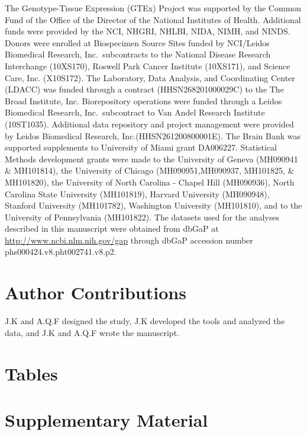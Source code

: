 \documentclass[12pt,letterpaper]{report}
\begin{document}
The Genotype-Tissue Expression (GTEx) Project was supported by the Common Fund of the Office of the Director of the National Institutes of Health. Additional funds were provided by the NCI, NHGRI, NHLBI, NIDA, NIMH, and NINDS. Donors were enrolled at Biospecimen Source Sites funded by NCI/Leidos Biomedical Research, Inc.\ subcontracts to the National Disease Research Interchange (10XS170), Roswell Park Cancer Institute (10XS171), and Science Care, Inc. (X10S172). The Laboratory, Data Analysis, and Coordinating Center (LDACC) was funded through a contract (HHSN268201000029C) to the The Broad Institute, Inc. Biorepository operations were funded through a Leidos Biomedical Research, Inc.\ subcontract to Van Andel Research Institute (10ST1035). Additional data repository and project management were provided by Leidos Biomedical Research, Inc.(HHSN261200800001E). The Brain Bank was supported supplements to University of Miami grant DA006227. Statistical Methods development grants were made to the University of Geneva (MH090941 \& MH101814), the University of Chicago (MH090951,MH090937, MH101825, \& MH101820), the University of North Carolina - Chapel Hill (MH090936), North Carolina State University (MH101819), Harvard University (MH090948), Stanford University (MH101782), Washington University (MH101810), and to the University of Pennsylvania (MH101822). The datasets used for the analyses described in this manuscript were obtained from dbGaP at \url{http://www.ncbi.nlm.nih.gov/gap} through dbGaP accession number phs000424.v8.pht002741.v8.p2.

\section*{Author Contributions}
J.K and A.Q.F designed the study, J.K developed the tools and analyzed the data, and J.K and A.Q.F wrote the manuscript.


 


\newpage
\section*{Tables}





\section*{Supplementary Material}
\end{document}
